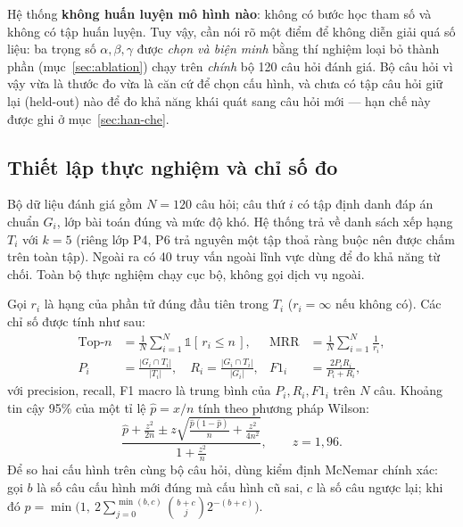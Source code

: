 Hệ thống \textbf{không huấn luyện mô hình nào}: không có bước học tham số và không có tập huấn
luyện. Tuy vậy, cần nói rõ một điểm để không diễn giải quá số liệu: ba trọng số $\alpha, \beta,
\gamma$ được \emph{chọn và biện minh} bằng thí nghiệm loại bỏ thành phần
(mục~\ref{sec:ablation}) chạy trên \emph{chính} bộ 120 câu hỏi đánh giá. Bộ câu hỏi vì vậy vừa
là thước đo vừa là căn cứ để chọn cấu hình, và chưa có tập câu hỏi giữ lại (held-out) nào để
đo khả năng khái quát sang câu hỏi mới --- hạn chế này được ghi ở mục~\ref{sec:han-che}.

\subsection{Thiết lập thực nghiệm và chỉ số đo}
\label{sec:chi-so}

Bộ dữ liệu đánh giá gồm $N = 120$ câu hỏi; câu thứ $i$ có tập định danh đáp án chuẩn $G_i$,
lớp bài toán đúng và mức độ khó. Hệ thống trả về danh sách xếp hạng $T_i$ với $k = 5$ (riêng
lớp P4, P6 trả nguyên một tập thoả ràng buộc nên được chấm trên toàn tập). Ngoài ra có 40 truy
vấn ngoài lĩnh vực dùng để đo khả năng từ chối. Toàn bộ thực nghiệm chạy cục bộ, không gọi
dịch vụ ngoài.

Gọi $r_i$ là hạng của phần tử đúng đầu tiên trong $T_i$ ($r_i = \infty$ nếu không có). Các
chỉ số được tính như sau:
\begin{align}
  \text{Top-}n &= \frac{1}{N}\sum_{i=1}^{N} \mathbb{1}[\, r_i \le n \,],
  &
  \text{MRR} &= \frac{1}{N}\sum_{i=1}^{N} \frac{1}{r_i},
  \label{eq:topk-mrr}\\[2pt]
  P_i &= \frac{|G_i \cap T_i|}{|T_i|},\quad R_i = \frac{|G_i \cap T_i|}{|G_i|},
  &
  F1_i &= \frac{2 P_i R_i}{P_i + R_i},
  \label{eq:prf}
\end{align}
với precision, recall, F1 macro là trung bình của $P_i, R_i, F1_i$ trên $N$ câu. Khoảng tin cậy
95\% của một tỉ lệ $\hat p = x/n$ tính theo phương pháp Wilson:
\begin{equation}
  \frac{\hat p + \frac{z^2}{2n} \pm z\sqrt{\frac{\hat p(1-\hat p)}{n} + \frac{z^2}{4n^2}}}
       {1 + \frac{z^2}{n}}, \qquad z = 1{,}96.
  \label{eq:wilson}
\end{equation}
Để so hai cấu hình trên cùng bộ câu hỏi, dùng kiểm định McNemar chính xác: gọi $b$ là số câu
cấu hình mới đúng mà cấu hình cũ sai, $c$ là số câu ngược lại; khi đó
$p = \min\!\big(1,\ 2\sum_{j=0}^{\min(b,c)} \binom{b+c}{j} 2^{-(b+c)}\big)$.

